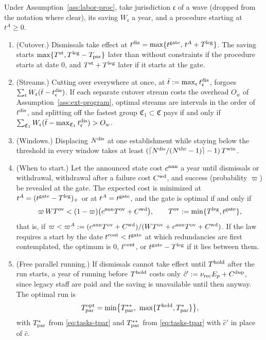 \begin{proposition}\label{prop:labor-lead}
Under Assumption~\ref{ass:labor-proc}, take jurisdiction $\mathfrak c$ of a wave (dropped from the notation where clear), its saving $W_{\mathfrak c}$ a year, and a procedure starting at $t^A\ge0$.
\begin{enumerate}
\item[(a)] (Cutover.) Dismissals take effect at $t^{\rm dis}=\max\{t^{\rm gate},\,t^A+T^{\rm leg}\}$. The saving starts $\max\{T^{\rm st},T^{\rm leg}-T_{\rm par}\}$ later than without constraints if the procedure starts at date 0, and $T^{\rm st}+T^{\rm leg}$ later if it starts at the gate.
\item[(b)] (Streams.) Cutting over everywhere at once, at $\bar t:=\max_{\mathfrak c}t^{\rm dis}_{\mathfrak c}$, forgoes $\sum_{\mathfrak c}W_{\mathfrak c}(\bar t-t^{\rm dis}_{\mathfrak c})$. If each separate cutover stream costs the overhead $O_w$ of Assumption~\ref{ass:ext-program}, optimal streams are intervals in the order of $t^{\rm dis}$, and splitting off the fastest group $\mathfrak C_1\subset\mathfrak C$ pays if and only if $\sum_{\mathfrak C_1}W_{\mathfrak c}(\bar t-\max_{\mathfrak C_1}t^{\rm dis}_{\mathfrak c})>O_w$.
\item[(c)] (Windows.) Displacing $N^{\rm dis}$ at one establishment while staying below the threshold in every window takes at least $(\lceil N^{\rm dis}/(N^{\rm thr}-1)\rceil-1)\,T^{\rm win}$.
\item[(d)] (When to start.) Let the announced state cost $c^{\rm ann}$ a year until dismissals or withdrawal, withdrawal after a failure cost $C^{\rm wd}$, and success (probability $\varpi$) be revealed at the gate. The expected cost is minimized at $t^A=(t^{\rm gate}-T^{\rm leg})_+$ or at $t^A=t^{\rm gate}$, and the gate is optimal if and only if
\begin{equation}\label{eq:labor-ann}
\varpi\,WT^{\rm ov}<(1-\varpi)\bigl(c^{\rm ann}T^{\rm ov}+C^{\rm wd}\bigr),\qquad T^{\rm ov}:=\min\{T^{\rm leg},t^{\rm gate}\},
\end{equation}
that is, if $\varpi<\varpi^A:=(c^{\rm ann}T^{\rm ov}+C^{\rm wd})/(WT^{\rm ov}+c^{\rm ann}T^{\rm ov}+C^{\rm wd})$. If the law requires a start by the date $t^{\rm cont}<t^{\rm gate}$ at which redundancies are first contemplated, the optimum is $0$, $t^{\rm cont}$, or $t^{\rm gate}-T^{\rm leg}$ if it lies between them.
\item[(e)] (Free parallel running.) If dismissals cannot take effect until $T^{\rm hold}$ after the run starts, a year of running before $T^{\rm hold}$ costs only $\hat c':=\nu_{\rm rec}E_p+C^{\rm dup}$, since legacy staff are paid and the saving is unavailable until then anyway. The optimal run is
\begin{equation}\label{eq:labor-freerun}
T^{\rm opt}_{\rm par}=\min\bigl\{T^{**}_{\rm par},\ \max\{T^{\rm hold},T^*_{\rm par}\}\bigr\},
\end{equation}
with $T^*_{\rm par}$ from \eqref{eq:tasks-tpar} and $T^{**}_{\rm par}$ from \eqref{eq:tasks-tpar} with $\hat c'$ in place of $\hat c$.
\end{enumerate}
\end{proposition}


